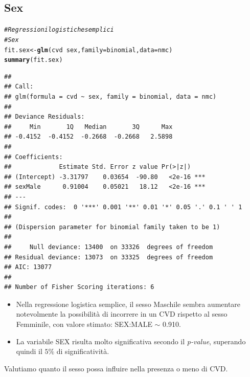 \documentclass{article}\usepackage[]{graphicx}\usepackage[]{xcolor}
\makeatletter
\newcommand{\hlcom}[1]{\textcolor[rgb]{0.678,0.584,0.686}{\textit{#1}}}%
\newcommand{\hlopt}[1]{\textcolor[rgb]{0,0,0}{#1}}%
\newcommand{\hlstd}[1]{\textcolor[rgb]{0.345,0.345,0.345}{#1}}%
\newcommand{\hlkwb}[1]{\textcolor[rgb]{0.69,0.353,0.396}{#1}}%
\newcommand{\hlkwc}[1]{\textcolor[rgb]{0.333,0.667,0.333}{#1}}%
\newcommand{\hlkwd}[1]{\textcolor[rgb]{0.737,0.353,0.396}{\textbf{#1}}}%
\newenvironment{kframe}{%
 \def\at@end@of@kframe{}%
 \ifinner\ifhmode%
  \def\at@end@of@kframe{\end{minipage}}%
  \begin{minipage}{\columnwidth}%
 \fi\fi%
 \def\FrameCommand##1{\hskip\@totalleftmargin \hskip-\fboxsep
 \colorbox{shadecolor}{##1}\hskip-\fboxsep
     \hskip-\linewidth \hskip-\@totalleftmargin \hskip\columnwidth}%
 \MakeFramed {\advance\hsize-\width
   \@totalleftmargin\z@ \linewidth\hsize
   \@setminipage}}%
 {\par\unskip\endMakeFramed%
 \at@end@of@kframe}
\newenvironment{knitrout}{}{} %
\makeatother
\begin{document}
  \clearpage
  
  \subsection{Sex}
\begin{knitrout}
\color{fgcolor}\begin{kframe}
\begin{alltt}
\hlcom{#Regressioni logistiche semplici}
\hlcom{#Sex}
\hlstd{fit.sex} \hlkwb{<-} \hlkwd{glm}\hlstd{(cvd}\hlopt{~}\hlstd{sex,} \hlkwc{family}\hlstd{=binomial,} \hlkwc{data}\hlstd{=nmc)}
\hlkwd{summary}\hlstd{(fit.sex)}
\end{alltt}
\begin{verbatim}
## 
## Call:
## glm(formula = cvd ~ sex, family = binomial, data = nmc)
## 
## Deviance Residuals: 
##     Min       1Q   Median       3Q      Max  
## -0.4152  -0.4152  -0.2668  -0.2668   2.5898  
## 
## Coefficients:
##             Estimate Std. Error z value Pr(>|z|)    
## (Intercept) -3.31797    0.03654  -90.80   <2e-16 ***
## sexMale      0.91004    0.05021   18.12   <2e-16 ***
## ---
## Signif. codes:  0 '***' 0.001 '**' 0.01 '*' 0.05 '.' 0.1 ' ' 1
## 
## (Dispersion parameter for binomial family taken to be 1)
## 
##     Null deviance: 13400  on 33326  degrees of freedom
## Residual deviance: 13073  on 33325  degrees of freedom
## AIC: 13077
## 
## Number of Fisher Scoring iterations: 6
\end{verbatim}
\end{kframe}
\end{knitrout}
    
    \begin{itemize}
      \item Nella regressione logistica semplice, il sesso Maschile 
            sembra aumentare notevolmente la possibilità di incorrere in un CVD 
            rispetto al sesso Femminile, con valore stimato: 
            SEX:MALE $\sim$ 0.910.
      \item La variabile SEX risulta molto significativa secondo 
            il \emph{p-value}, superando quindi il $5\%$ di significatività.
    \end{itemize}
    
    Valutiamo quanto il sesso possa influire nella presenza o meno di CVD.
    
\end{document}
